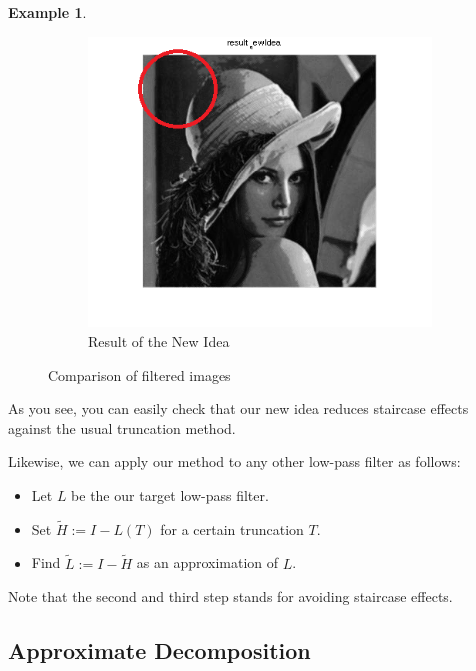 \documentclass[12pt]{amsart}
\theoremstyle{definition}
\newtheorem{ex}[thm]{Example}
\theoremstyle{remark}
\numberwithin{thm}{section}
\begin{document}
\begin{ex}
\begin{figure}[h]
\begin{subfigure}[b]{0.3\textwidth} \includegraphics[width=\textwidth]{new.png} \caption{Result of the New Idea} \label{fig:new} \end{subfigure}
\caption{Comparison of filtered images}\label{fig:comp} 
\end{figure}

As you see, you can easily check that our new idea reduces staircase effects against the usual truncation method.
\end{ex}

Likewise, we can apply our method to any other low-pass filter as follows:

\begin{itemize}
\item[1.] Let $L$ be the our target low-pass filter.
\item[2.] Set $\tilde{H}:=I-L(T)$ for a certain truncation $T$.
\item[3.] Find $\tilde{L}:=I-\tilde{H}$ as an approximation of $L$.
\end{itemize}

Note that the second and third step stands for avoiding staircase effects.


\subsection{Approximate Decomposition}
\end{document}
